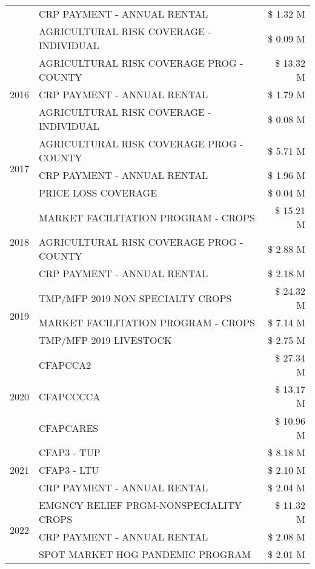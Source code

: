 \begin{tabular}{llr}
 & CRP PAYMENT - ANNUAL RENTAL & \$ 1.32 M \\
 & AGRICULTURAL RISK COVERAGE - INDIVIDUAL & \$ 0.09 M \\
\cline{1-3}
\multirow[t]{3}{*}{2016} & AGRICULTURAL RISK COVERAGE PROG - COUNTY & \$ 13.32 M \\
 & CRP PAYMENT - ANNUAL RENTAL & \$ 1.79 M \\
 & AGRICULTURAL RISK COVERAGE - INDIVIDUAL & \$ 0.08 M \\
\cline{1-3}
\multirow[t]{3}{*}{2017} & AGRICULTURAL RISK COVERAGE PROG - COUNTY & \$ 5.71 M \\
 & CRP PAYMENT - ANNUAL RENTAL & \$ 1.96 M \\
 & PRICE LOSS COVERAGE & \$ 0.04 M \\
\cline{1-3}
\multirow[t]{3}{*}{2018} & MARKET FACILITATION PROGRAM - CROPS & \$ 15.21 M \\
 & AGRICULTURAL RISK COVERAGE PROG - COUNTY & \$ 2.88 M \\
 & CRP PAYMENT - ANNUAL RENTAL & \$ 2.18 M \\
\cline{1-3}
\multirow[t]{3}{*}{2019} & TMP/MFP 2019 NON SPECIALTY CROPS & \$ 24.32 M \\
 & MARKET FACILITATION PROGRAM - CROPS & \$ 7.14 M \\
 & TMP/MFP 2019 LIVESTOCK & \$ 2.75 M \\
\cline{1-3}
\multirow[t]{3}{*}{2020} & CFAPCCA2 & \$ 27.34 M \\
 & CFAPCCCCA & \$ 13.17 M \\
 & CFAPCARES & \$ 10.96 M \\
\cline{1-3}
\multirow[t]{3}{*}{2021} & CFAP3 - TUP & \$ 8.18 M \\
 & CFAP3 - LTU & \$ 2.10 M \\
 & CRP PAYMENT - ANNUAL RENTAL & \$ 2.04 M \\
\cline{1-3}
\multirow[t]{3}{*}{2022} & EMGNCY RELIEF PRGM-NONSPECIALITY CROPS & \$ 11.32 M \\
 & CRP PAYMENT - ANNUAL RENTAL & \$ 2.08 M \\
 & SPOT MARKET HOG PANDEMIC PROGRAM & \$ 2.01 M \\
\cline{1-3}
\bottomrule
\end{tabular}
